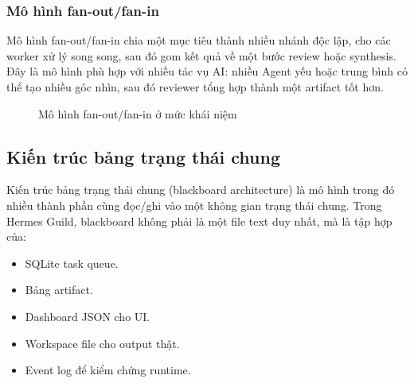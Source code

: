 \documentclass[12pt,a4paper]{article}
\begin{document}
\subsubsection{Mô hình fan-out/fan-in}

Mô hình fan-out/fan-in chia một mục tiêu thành nhiều nhánh độc lập, cho các worker xử lý song song, sau đó gom kết quả về một bước review hoặc synthesis. Đây là mô hình phù hợp với nhiều tác vụ AI: nhiều Agent yếu hoặc trung bình có thể tạo nhiều góc nhìn, sau đó reviewer tổng hợp thành một artifact tốt hơn.

\begin{figure}[H]
    \centering
    \caption{Mô hình fan-out/fan-in ở mức khái niệm}
\end{figure}

\subsection{Kiến trúc bảng trạng thái chung}

Kiến trúc bảng trạng thái chung (blackboard architecture) là mô hình trong đó nhiều thành phần cùng đọc/ghi vào một không gian trạng thái chung. Trong Hermes Guild, blackboard không phải là một file text duy nhất, mà là tập hợp của:

\begin{itemize}
    \item SQLite task queue.
    \item Bảng artifact.
    \item Dashboard JSON cho UI.
    \item Workspace file cho output thật.
    \item Event log để kiểm chứng runtime.
\end{itemize}
\end{document}
